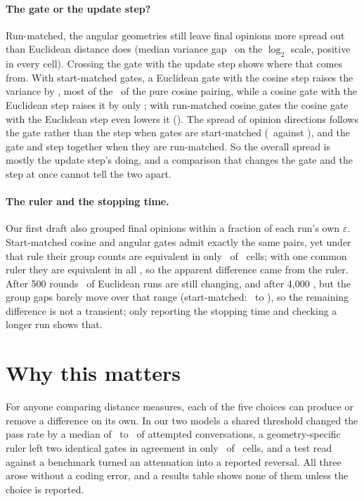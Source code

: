\documentclass[11pt]{article}
\begin{document}
\paragraph{The gate or the update step?}
Run-matched, the angular geometries still leave final opinions more spread out than Euclidean distance does (median variance gap \VRunVarGapCos\ on the $\log_2$ scale, positive in every cell).
Crossing the gate with the update step shows where that comes from.
With start-matched gates, a Euclidean gate with the cosine step raises the variance by \VXEucCosVar, most of the \VXCosCosVar\ of the pure cosine pairing, while a cosine gate with the Euclidean step raises it by only \VXCosEucVar; with run-matched cosine gates the cosine gate with the Euclidean step even lowers it (\VXRCosEucVar).
The spread of opinion directions follows the gate rather than the step when gates are start-matched (\VXCosEucDisp\ against \VXEucCosDisp), and the gate and step together when they are run-matched.
So the overall spread is mostly the update step's doing, and a comparison that changes the gate and the step at once cannot tell the two apart.

\paragraph{The ruler and the stopping time.}
Our first draft also grouped final opinions within a fraction of each run's own $\varepsilon$.
Start-matched cosine and angular gates admit exactly the same pairs, yet under that rule their group counts are equivalent in only \VCosAngOwnEquiv\ of \VCosAngCells\ cells; with one common ruler they are equivalent in all \VCosAngCommonEquiv, so the apparent difference came from the ruler.
After 500 rounds \VUnsettledFive\ of Euclidean runs are still changing, and after 4{,}000 \VUnsettledFour, but the group gaps barely move over that range (start-matched: \VHorTzeroFive\ to \VHorTzeroFour), so the remaining difference is not a transient; only reporting the stopping time and checking a longer run shows that.

\section{Why this matters}
\label{sec:relevance}

For anyone comparing distance measures, each of the five choices can produce or remove a difference on its own.
In our two models a shared threshold changed the pass rate by a median of \VRawPassGapAng\ to \VRawPassGapCos\ of attempted conversations, a geometry-specific ruler left two identical gates in agreement in only \VCosAngOwnEquiv\ of \VCosAngCells\ cells, and a test read against a benchmark turned an attenuation into a reported reversal.
All three arose without a coding error, and a results table shows none of them unless the choice is reported.
\end{document}
